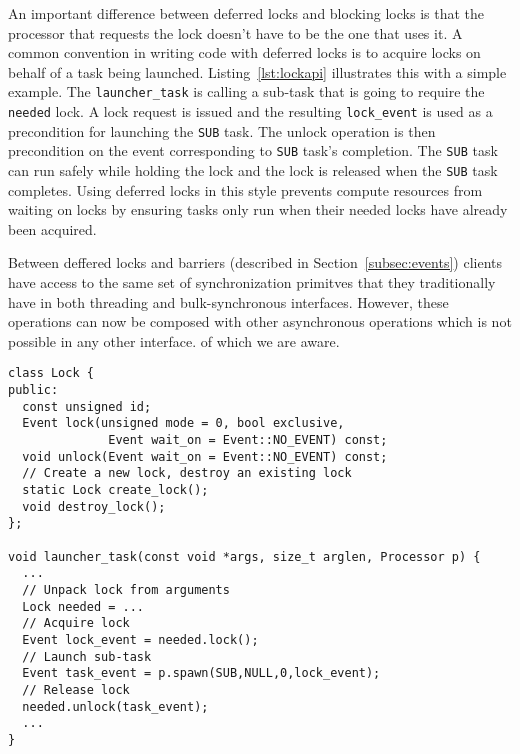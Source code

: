 An important difference between deferred locks and blocking locks is that the processor
that requests the lock doesn't have to be the one that uses it.  A common
convention in writing code with deferred locks is to acquire locks on behalf of a task being
launched.  Listing~\ref{lst:lockapi} illustrates this with a simple example.  The
{\tt launcher\_task} is calling a sub-task that is going to require the {\tt needed}
lock.  A lock request is issued and the resulting {\tt lock\_event} is used as
a precondition for launching the {\tt SUB} task.  The unlock operation is then
precondition on the event corresponding to {\tt SUB} task's completion.  The
{\tt SUB} task can run safely while holding the lock and the lock is released when the
{\tt SUB} task completes.  Using deferred locks in this style prevents 
compute resources from waiting on locks by ensuring tasks only run when their needed
locks have already been acquired.

Between deffered locks and barriers (described in Section~\ref{subsec:events}) clients 
have access to the same set of synchronization primitves that they traditionally have
in both threading and bulk-synchronous interfaces.  However, these operations can now 
be composed with other asynchronous operations which is not possible in any other interface.
of which we are aware.



\begin{lstlisting}[float={t},label={lst:lockapi},caption={Deferred Lock Interface and Example.}]
class Lock {
public:
  const unsigned id;
  Event lock(unsigned mode = 0, bool exclusive, 
              Event wait_on = Event::NO_EVENT) const;
  void unlock(Event wait_on = Event::NO_EVENT) const;
  // Create a new lock, destroy an existing lock
  static Lock create_lock();
  void destroy_lock();
};

void launcher_task(const void *args, size_t arglen, Processor p) {
  ...
  // Unpack lock from arguments
  Lock needed = ...
  // Acquire lock
  Event lock_event = needed.lock();
  // Launch sub-task
  Event task_event = p.spawn(SUB,NULL,0,lock_event);
  // Release lock
  needed.unlock(task_event);
  ...
}
\end{lstlisting}

